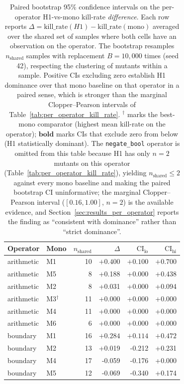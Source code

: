 \begin{table}[!htbp]
\centering
\small
\caption{Paired bootstrap 95\% confidence intervals on the per-operator H1-vs-mono kill-rate \emph{difference}. Each row reports $\Delta = \mathrm{kill\_rate}(H1) - \mathrm{kill\_rate}(\mathrm{mono})$ averaged over the shared set of samples where both cells have an observation on the operator. The bootstrap resamples $n_{\text{shared}}$ samples with replacement $B = 10{,}000$ times (seed 42), respecting the clustering of mutants within a sample. Positive CIs excluding zero establish H1 dominance over that mono baseline on that operator in a paired sense, which is stronger than the marginal Clopper--Pearson intervals of Table~\ref{tab:per_operator_kill_rate}. $^\dagger$ marks the best-mono comparator (highest mean kill-rate on the operator); $\mathbf{bold}$ marks CIs that exclude zero from below (H1 statistically dominant). The \texttt{negate\_bool} operator is omitted from this table because H1 has only $n = 2$ mutants on this operator (Table~\ref{tab:per_operator_kill_rate}), yielding $n_{\text{shared}} \leq 2$ against every mono baseline and making the paired bootstrap CI uninformative; the marginal Clopper--Pearson interval ($[0.16, 1.00]$, $n = 2$) is the available evidence, and Section~\ref{sec:results_per_operator} reports the finding as ``consistent with dominance'' rather than ``strict dominance''.}
\label{tab:paired_bootstrap_h1_vs_mono}
\begin{tabular}{@{}llrrrr@{}}
\toprule
Operator & Mono & $n_{\text{shared}}$ & $\Delta$ & $\text{CI}_{\text{lo}}$ & $\text{CI}_{\text{hi}}$ \\
\midrule
arithmetic & M1 & 10 & $\mathbf{+0.400}$ & $\mathbf{+0.100}$ & $\mathbf{+0.700}$ \\
arithmetic & M5 & 8 & +0.188 & +0.000 & +0.438 \\
arithmetic & M2 & 8 & +0.031 & +0.000 & +0.094 \\
arithmetic & M3$^\dagger$ & 11 & +0.000 & +0.000 & +0.000 \\
arithmetic & M4 & 11 & +0.000 & +0.000 & +0.000 \\
arithmetic & M6 & 6 & +0.000 & +0.000 & +0.000 \\
\midrule
boundary & M1 & 16 & $\mathbf{+0.284}$ & $\mathbf{+0.114}$ & $\mathbf{+0.472}$ \\
boundary & M2 & 13 & +0.019 & -0.212 & +0.231 \\
boundary & M4 & 17 & -0.059 & -0.176 & +0.000 \\
boundary & M5 & 12 & -0.069 & -0.340 & +0.174 \\

\end{tabular}
\end{table}
